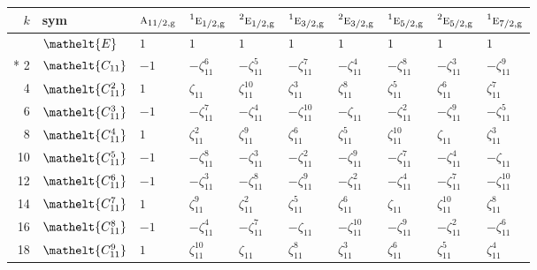 \documentclass[10pt,a4paper]{article}
\numberwithin{equation}{section}
\newcommand{\eltfont}[1]{{\let\sigma\eltsigma\mathelt{#1}}}
\newcommand{\irr}[1]{\text{\normalfont\scshape #1}}
\newcommand{\conjpair}[1]{{}^{#1}}
\newcommand{\cls}[1]{\eltfont{#1}}
\newcommand{\ptag}[1]{\mathrm{#1}}
\newcommand{\rootunity}[1]{\zeta_{#1}}
\begin{document}
{\small\setlength{\tabcolsep}{4pt}
\begin{longtable}{@{}rlllllllll@{}}\toprule
$k$ & sym & $\irr{a}_{11/2,\ptag{g}}$ & $\conjpair{1}\irr{e}_{1/2,\ptag{g}}$ & $\conjpair{2}\irr{e}_{1/2,\ptag{g}}$ & $\conjpair{1}\irr{e}_{3/2,\ptag{g}}$ & $\conjpair{2}\irr{e}_{3/2,\ptag{g}}$ & $\conjpair{1}\irr{e}_{5/2,\ptag{g}}$ & $\conjpair{2}\irr{e}_{5/2,\ptag{g}}$ & $\conjpair{1}\irr{e}_{7/2,\ptag{g}}$\\\midrule\endhead
\bottomrule\endfoot\endlastfoot
0 & $\cls{E}$ & $1$ & $1$ & $1$ & $1$ & $1$ & $1$ & $1$ & $1$\\*
2 & $\cls{C_{11}}$ & $-1$ & $-\rootunity{11}^{6}$ & $-\rootunity{11}^{5}$ & $-\rootunity{11}^{7}$ & $-\rootunity{11}^{4}$ & $-\rootunity{11}^{8}$ & $-\rootunity{11}^{3}$ & $-\rootunity{11}^{9}$\\
4 & $\cls{C_{11}^{2}}$ & $1$ & $\rootunity{11}$ & $\rootunity{11}^{10}$ & $\rootunity{11}^{3}$ & $\rootunity{11}^{8}$ & $\rootunity{11}^{5}$ & $\rootunity{11}^{6}$ & $\rootunity{11}^{7}$\\
6 & $\cls{C_{11}^{3}}$ & $-1$ & $-\rootunity{11}^{7}$ & $-\rootunity{11}^{4}$ & $-\rootunity{11}^{10}$ & $-\rootunity{11}$ & $-\rootunity{11}^{2}$ & $-\rootunity{11}^{9}$ & $-\rootunity{11}^{5}$\\
8 & $\cls{C_{11}^{4}}$ & $1$ & $\rootunity{11}^{2}$ & $\rootunity{11}^{9}$ & $\rootunity{11}^{6}$ & $\rootunity{11}^{5}$ & $\rootunity{11}^{10}$ & $\rootunity{11}$ & $\rootunity{11}^{3}$\\
10 & $\cls{C_{11}^{5}}$ & $-1$ & $-\rootunity{11}^{8}$ & $-\rootunity{11}^{3}$ & $-\rootunity{11}^{2}$ & $-\rootunity{11}^{9}$ & $-\rootunity{11}^{7}$ & $-\rootunity{11}^{4}$ & $-\rootunity{11}$\\
12 & $\cls{C_{11}^{6}}$ & $-1$ & $-\rootunity{11}^{3}$ & $-\rootunity{11}^{8}$ & $-\rootunity{11}^{9}$ & $-\rootunity{11}^{2}$ & $-\rootunity{11}^{4}$ & $-\rootunity{11}^{7}$ & $-\rootunity{11}^{10}$\\
14 & $\cls{C_{11}^{7}}$ & $1$ & $\rootunity{11}^{9}$ & $\rootunity{11}^{2}$ & $\rootunity{11}^{5}$ & $\rootunity{11}^{6}$ & $\rootunity{11}$ & $\rootunity{11}^{10}$ & $\rootunity{11}^{8}$\\
16 & $\cls{C_{11}^{8}}$ & $-1$ & $-\rootunity{11}^{4}$ & $-\rootunity{11}^{7}$ & $-\rootunity{11}$ & $-\rootunity{11}^{10}$ & $-\rootunity{11}^{9}$ & $-\rootunity{11}^{2}$ & $-\rootunity{11}^{6}$\\
18 & $\cls{C_{11}^{9}}$ & $1$ & $\rootunity{11}^{10}$ & $\rootunity{11}$ & $\rootunity{11}^{8}$ & $\rootunity{11}^{3}$ & $\rootunity{11}^{6}$ & $\rootunity{11}^{5}$ & $\rootunity{11}^{4}$\\

\end{longtable}}
\end{document}
